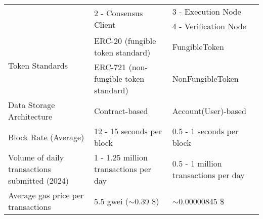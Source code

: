 \begin{table}[]
\begin{tabular}{@{}|l|ll|@{}}
                                                                   & \multicolumn{1}{l|}{\multirow{2}{*}{2 - Consensus Client}}          & 3 - Execution Node                                         \\ \cmidrule(l){3-3}
                                                                   & \multicolumn{1}{l|}{}                                               & 4 - Verification Node                                      \\ \midrule
        \multirow{2}{*}{Token Standards}                           & \multicolumn{1}{l|}{ERC-20 (fungible token standard)}               & FungibleToken                                              \\ \cmidrule(l){2-3}
                                                                   & \multicolumn{1}{l|}{ERC-721 (non-fungible token standard)}          & NonFungibleToken                                           \\ \midrule
        Data Storage Architecture                                  & \multicolumn{1}{l|}{Contract-based}                                 & Account(User)-based                                        \\ \midrule
        Block Rate (Average)                                       & \multicolumn{1}{l|}{12 - 15 seconds per block}                      & 0.5 - 1 seconds per block                                  \\ \midrule
        Volume of daily transactions submitted (2024)              & \multicolumn{1}{l|}{1 - 1.25 million transactions per day}          & 0.5 - 1 million transactions per day                       \\ \midrule
        Average gas price per transactions                         & \multicolumn{1}{l|}{5.5 gwei ($\sim$0.39 \$)}                       & $\sim$0.00000845 \$                                        \\ \bottomrule
    \end{tabular}
    \caption{}
    \label{tab:my-table}
\end{table}